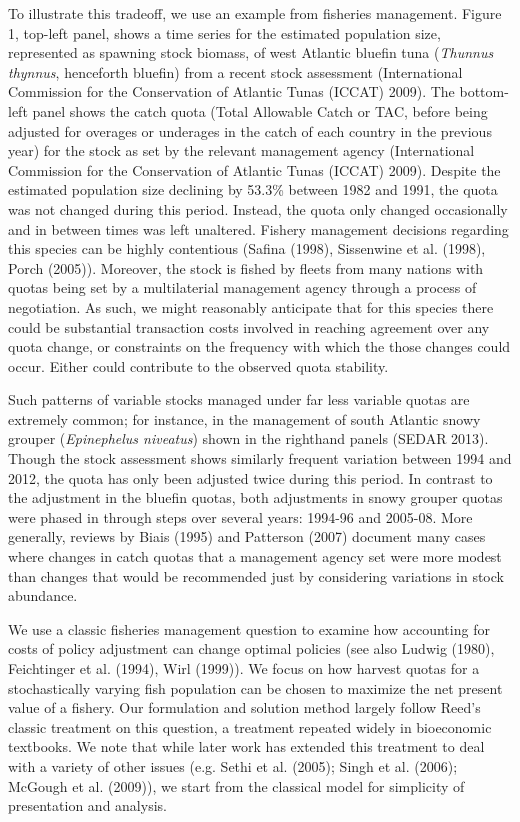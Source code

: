 \documentclass[review,12pt,author-year,titlepage]{components/elsarticle} %
\begin{document}
\begin{flushleft}
To illustrate this tradeoff, we use an example from fisheries
management. Figure 1, top-left panel, shows a time series for the
estimated population size, represented as spawning stock biomass, of
west Atlantic bluefin tuna (\emph{Thunnus thynnus}, henceforth bluefin)
from a recent stock assessment (International Commission for the
Conservation of Atlantic Tunas (ICCAT) 2009). The bottom-left panel
shows the catch quota (Total Allowable Catch or TAC, before being
adjusted for overages or underages in the catch of each country in the
previous year) for the stock as set by the relevant management agency
(International Commission for the Conservation of Atlantic Tunas (ICCAT)
2009). Despite the estimated population size declining by 53.3\% between
1982 and 1991, the quota was not changed during this period. Instead,
the quota only changed occasionally and in between times was left
unaltered. Fishery management decisions regarding this species can be
highly contentious (Safina (1998), Sissenwine et al. (1998), Porch
(2005)). Moreover, the stock is fished by fleets from many nations with
quotas being set by a multilaterial management agency through a process
of negotiation. As such, we might reasonably anticipate that for this
species there could be substantial transaction costs involved in
reaching agreement over any quota change, or constraints on the
frequency with which the those changes could occur. Either could
contribute to the observed quota stability.

Such patterns of variable stocks managed under far less variable quotas
are extremely common; for instance, in the management of south Atlantic
snowy grouper (\emph{Epinephelus niveatus}) shown in the righthand
panels (SEDAR 2013). Though the stock assessment shows similarly
frequent variation between 1994 and 2012, the quota has only been
adjusted twice during this period. In contrast to the adjustment in the
bluefin quotas, both adjustments in snowy grouper quotas were phased in
through steps over several years: 1994-96 and 2005-08. More generally,
reviews by Biais (1995) and Patterson (2007) document many cases where
changes in catch quotas that a management agency set were more modest
than changes that would be recommended just by considering variations in
stock abundance.

We use a classic fisheries management question to examine how accounting
for costs of policy adjustment can change optimal policies (see also
Ludwig (1980), Feichtinger et al. (1994), Wirl (1999)). We focus on how
harvest quotas for a stochastically varying fish population can be
chosen to maximize the net present value of a fishery. Our formulation
and solution method largely follow Reed's classic treatment on this
question, a treatment repeated widely in bioeconomic textbooks. We note
that while later work has extended this treatment to deal with a variety
of other issues (e.g. Sethi et al. (2005); Singh et al. (2006); McGough
et al. (2009)), we start from the classical model for simplicity of
presentation and analysis.


\end{flushleft}
\end{document}
